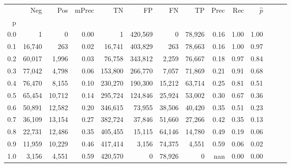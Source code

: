 \begin{tabular}{rrrrrrrrrrrrrr}
\toprule
{} &     Neg &     Pos & mPrec &       TN &       FP &      FN &      TP &  Prec &   Rec & $\hat{p}$ \\
p   &         &         &       &          &          &         &         &       &       &           \\
\midrule
0.0 &       1 &       0 &  0.00 &        1 &  420,569 &       0 &  78,926 &  0.16 &  1.00 &      1.00 \\
0.1 &  16,740 &     263 &  0.02 &   16,741 &  403,829 &     263 &  78,663 &  0.16 &  1.00 &      0.97 \\
0.2 &  60,017 &   1,996 &  0.03 &   76,758 &  343,812 &   2,259 &  76,667 &  0.18 &  0.97 &      0.84 \\
0.3 &  77,042 &   4,798 &  0.06 &  153,800 &  266,770 &   7,057 &  71,869 &  0.21 &  0.91 &      0.68 \\
0.4 &  76,470 &   8,155 &  0.10 &  230,270 &  190,300 &  15,212 &  63,714 &  0.25 &  0.81 &      0.51 \\
0.5 &  65,454 &  10,712 &  0.14 &  295,724 &  124,846 &  25,924 &  53,002 &  0.30 &  0.67 &      0.36 \\
0.6 &  50,891 &  12,582 &  0.20 &  346,615 &   73,955 &  38,506 &  40,420 &  0.35 &  0.51 &      0.23 \\
0.7 &  36,109 &  13,154 &  0.27 &  382,724 &   37,846 &  51,660 &  27,266 &  0.42 &  0.35 &      0.13 \\
0.8 &  22,731 &  12,486 &  0.35 &  405,455 &   15,115 &  64,146 &  14,780 &  0.49 &  0.19 &      0.06 \\
0.9 &  11,959 &  10,229 &  0.46 &  417,414 &    3,156 &  74,375 &   4,551 &  0.59 &  0.06 &      0.02 \\
1.0 &   3,156 &   4,551 &  0.59 &  420,570 &        0 &  78,926 &       0 &   nan &  0.00 &      0.00 \\
\bottomrule
\end{tabular}
